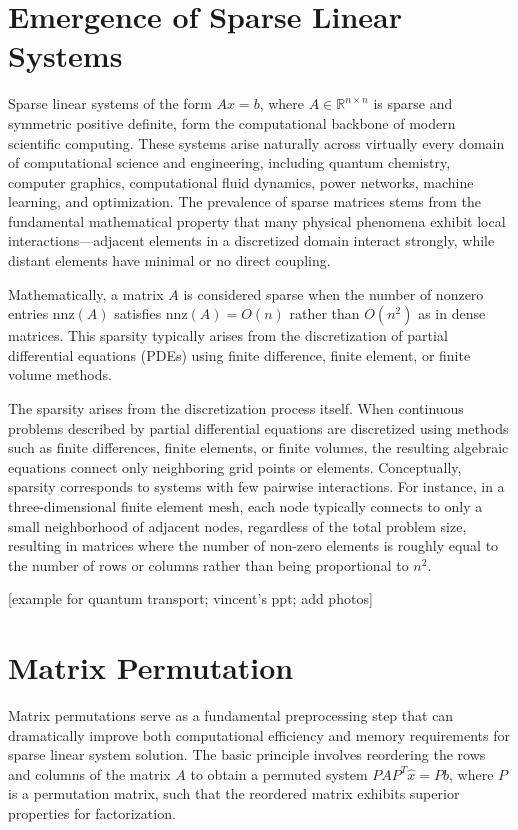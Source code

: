 \section{Emergence of Sparse Linear Systems}
Sparse linear systems of the form $Ax = b$, where $A \in \mathbb{R}^{n \times n}$ is sparse and symmetric positive definite, form the computational backbone of modern scientific computing. These systems arise naturally across virtually every domain of computational science and engineering, including quantum chemistry, computer graphics, computational fluid dynamics, power networks, machine learning, and optimization. The prevalence of sparse matrices stems from the fundamental mathematical property that many physical phenomena exhibit local interactions—adjacent elements in a discretized domain interact strongly, while distant elements have minimal or no direct coupling.

Mathematically, a matrix $A$ is considered sparse when the number of nonzero entries $\text{nnz}(A)$ satisfies $\text{nnz}(A) = O(n)$ rather than $O(n^2)$ as in dense matrices. This sparsity typically arises from the discretization of partial differential equations (PDEs) using finite difference, finite element, or finite volume methods. 

The sparsity arises from the discretization process itself. When continuous problems described by partial differential equations are discretized using methods such as finite differences, finite elements, or finite volumes, the resulting algebraic equations connect only neighboring grid points or elements. Conceptually, sparsity corresponds to systems with few pairwise interactions. For instance, in a three-dimensional finite element mesh, each node typically connects to only a small neighborhood of adjacent nodes, regardless of the total problem size, resulting in matrices where the number of non-zero elements is roughly equal to the number of rows or columns rather than being proportional to $n^2$.

[example for quantum transport; vincent's ppt; add photos]



\section{Matrix Permutation}

Matrix permutations serve as a fundamental preprocessing step that can dramatically improve both computational efficiency and memory requirements for sparse linear system solution. The basic principle involves reordering the rows and columns of the matrix $A$ to obtain a permuted system $PAP^T \hat{x} = Pb$, where $P$ is a permutation matrix, such that the reordered matrix exhibits superior properties for factorization.

